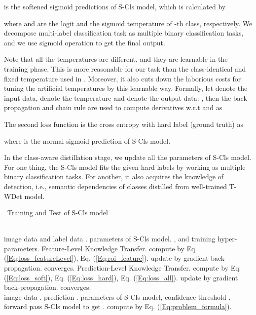 \documentclass[sigconf,natbib=false]{acmart}
\begin{document}
  is the softened sigmoid predictions of S-Cls model, which is calculated by

where  and  are the logit and the sigmoid temperature of -th class, respectively. We decompose multi-label classification task as multiple binary classification tasks, and we use sigmoid operation to get the final output.

Note that all the temperatures are different, and they are learnable in the training phase. This is more reasonable for our task than the class-identical and fixed temperature used in \cite{KD1_nips15_goj}. Moreover, it also cuts down the laborious costs for tuning the artificial temperatures by this learnable way. Formally, let  denote the input data,  denote the temperature and  denote the output data:  , then the back-propagation and chain rule are used to compute derivatives w.r.t  and  as


The second loss function is the cross entropy with hard label (ground truth)  as

where  is the normal sigmoid prediction of S-Cls model.

In the class-aware distillation stage, we update all the parameters  of S-Cls model. For one thing, the S-Cls model fits the given hard labels by working as multiple binary classification tasks. For another, it also acquires the knowledge of detection, i.e., semantic dependencies of classes distilled from well-trained T-WDet model.
{\renewcommand\baselinestretch{1}\selectfont
\renewcommand{\algorithmicrequire}{\textbf{Input:}}   \renewcommand{\algorithmicensure}{\textbf{Output:}}
\renewcommand{\algorithmicrepeat}{\textbf{Repeat:}}   \renewcommand{\algorithmicuntil}{\textbf{Until:}}
\renewcommand{\algorithmicreturn}{\textbf{Return:}}
\begin{algorithm}[t]
\caption{\ Training and Test of S-Cls model}
\label{alg:train_test}
\begin{algorithmic}[1]
\TRAINING ~~ \\
\REQUIRE image data and label data .
\ENSURE parameters  of S-Cls model.
\INITIALIZE ,  and training hyper-parameters.
\STAGEONE Feature-Level Knowledge Transfer.
\REPEAT
\STATE compute  by Eq. (\ref{Eq:loss_featureLevel}), Eq. (\ref{Eq:roi_feature}).
\STATE update  by gradient back-propagation.
\UNTIL  converges.
\STAGETWO Prediction-Level Knowledge Transfer.
\REPEAT
\STATE compute  by Eq. (\ref{Eq:loss_soft}), Eq. (\ref{Eq:loss_hard}), Eq. (\ref{Eq:loss_all}).
\STATE update  by gradient back-propagation.
\UNTIL  converges.
\MYRETURN 
\vspace{+1mm}
\TESTING ~~ \\
\REQUIRE image data .
\ENSURE prediction .
\INITIALIZE parameters  of S-Cls model, confidence threshold .
\STATE forward pass S-Cls model to get .
\STATE compute  by Eq. (\ref{Eq:problem_formula}).
\ENDFOR
\MYRETURN 
\end{algorithmic}
\end{algorithm}
\par} 
\end{document}
